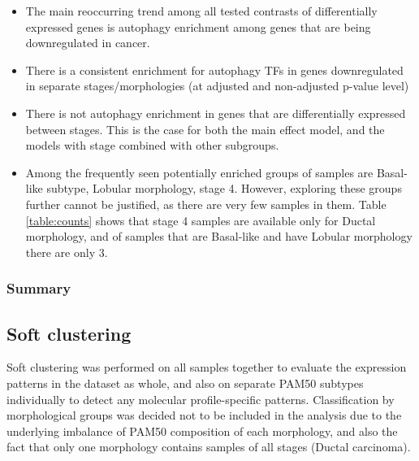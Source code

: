         \begin{itemize}
            
        \item The main reoccurring trend among all tested contrasts of differentially expressed genes is autophagy enrichment among genes that are being downregulated in cancer. 
        \item There is a consistent enrichment for autophagy TFs in genes downregulated in separate stages/morphologies (at adjusted and non-adjusted p-value level)
       \item There is not autophagy enrichment in genes that are differentially expressed between stages. This is the case for both the main effect model, and the models with stage combined with other subgroups.

       \item Among the frequently seen potentially enriched groups of samples are Basal-like subtype, Lobular morphology, stage 4.  However, exploring these groups further cannot be justified, as there are very few samples in them. Table \ref{table:counts} shows that stage 4 samples are available only for Ductal morphology, and of samples that are Basal-like and have Lobular morphology there are only 3. 

        
        \end{itemize}
        \subsubsection{Summary}
        

\newpage
    \subsection{Soft clustering}
    Soft clustering was performed on all samples together to evaluate the expression patterns in the dataset as whole, and also on separate PAM50 subtypes individually to detect any molecular profile-specific patterns. Classification by morphological groups was decided not to be included in the analysis due to the underlying imbalance of PAM50 composition of each morphology, and also the fact that only one morphology contains samples of all stages (Ductal carcinoma). 

    
   
